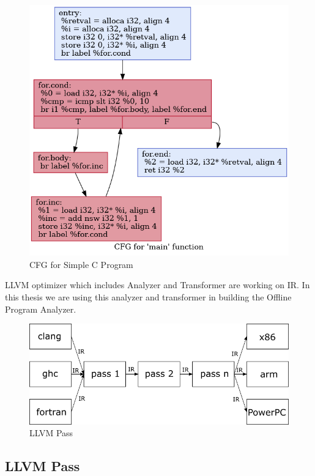 \begin{figure}[htbp]
\centerline{\includegraphics[scale=.5]{Figures/03/cfg.png}}
\caption{CFG for Simple C Program}
\label{fig:cfg}
\end{figure}


LLVM optimizer \textemdash{} which includes Analyzer and Transformer \textemdash{} are working on IR. In this thesis we are using this analyzer and transformer in building the Offline Program Analyzer.

\begin{figure}[htbp] 
    \centerline{\includegraphics[scale=.75]{Figures/03/llvm-overview.png}} 
    \caption{LLVM Pass} 
    \label{fig:llvm} 
\end{figure} 

\subsection{LLVM Pass}

